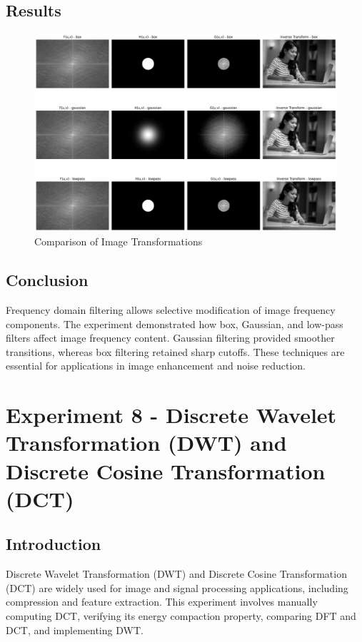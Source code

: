\documentclass{report}
\begin{document}
\section{Results}

\begin{figure}[h]
    \includegraphics[width=\textwidth]{images/Exp-7-Results-1.png}
    \caption{Comparison of Image Transformations}
    \label{fig:noisy}
\end{figure}

\section{Conclusion}
Frequency domain filtering allows selective modification of image frequency components. The experiment demonstrated how box, Gaussian, and low-pass filters affect image frequency content. Gaussian filtering provided smoother transitions, whereas box filtering retained sharp cutoffs. These techniques are essential for applications in image enhancement and noise reduction.

\chapter{Experiment 8 - Discrete Wavelet Transformation (DWT) and Discrete Cosine Transformation (DCT)}

\section{Introduction}
Discrete Wavelet Transformation (DWT) and Discrete Cosine Transformation (DCT) are widely used for image and signal processing applications, including compression and feature extraction. This experiment involves manually computing DCT, verifying its energy compaction property, comparing DFT and DCT, and implementing DWT.
\end{document}
